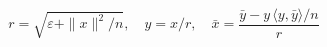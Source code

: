 \documentclass{article}
\begin{document}
\begin{preview}

\[ r = \sqrt{\varepsilon + \|x\|^2/n},\quad y = x/r,\quad \bar x = \dfrac{\bar y - y\,\langle y, \bar y\rangle / n}{r} \]

\end{preview}
\end{document}
